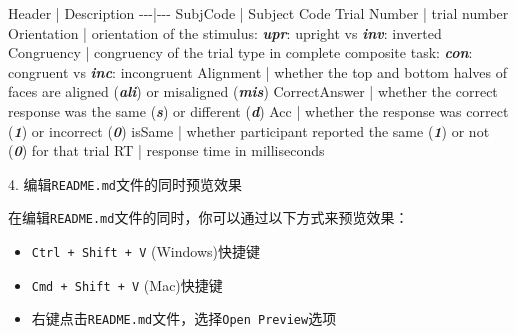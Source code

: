 \documentclass[]{ctexbook}
\newenvironment{Shaded}{\begin{snugshade}}{\end{snugshade}}
\newcommand{\InformationTok}[1]{\textcolor[rgb]{0.56,0.35,0.01}{\textbf{\textit{#1}}}}
\newcommand{\NormalTok}[1]{#1}
\providecommand{\tightlist}{%
  \setlength{\itemsep}{0pt}\setlength{\parskip}{0pt}}
\theoremstyle{definition}
\theoremstyle{definition}
\theoremstyle{definition}
\theoremstyle{definition}
\theoremstyle{remark}
\begin{document}
\begin{Shaded}
\begin{Highlighting}[]

\NormalTok{Header | Description}
\NormalTok{{-}{-}{-}|{-}{-}{-}}
\NormalTok{SubjCode | Subject Code}
\NormalTok{Trial Number | trial number}
\NormalTok{Orientation | orientation of the stimulus: }\InformationTok{\textasciigrave{}upr\textasciigrave{}}\NormalTok{: upright vs }\InformationTok{\textasciigrave{}inv\textasciigrave{}}\NormalTok{: inverted}
\NormalTok{Congruency | congruency of the trial type in complete composite task: }\InformationTok{\textasciigrave{}con\textasciigrave{}}\NormalTok{: congruent vs }\InformationTok{\textasciigrave{}inc\textasciigrave{}}\NormalTok{: incongruent}
\NormalTok{Alignment | whether the top and bottom halves of faces are aligned (}\InformationTok{\textasciigrave{}ali\textasciigrave{}}\NormalTok{) or misaligned (}\InformationTok{\textasciigrave{}mis\textasciigrave{}}\NormalTok{)}
\NormalTok{CorrectAnswer | whether the correct response was the same (}\InformationTok{\textasciigrave{}s\textasciigrave{}}\NormalTok{) or different (}\InformationTok{\textasciigrave{}d\textasciigrave{}}\NormalTok{)}
\NormalTok{Acc | whether the response was correct (}\InformationTok{\textasciigrave{}1\textasciigrave{}}\NormalTok{) or incorrect (}\InformationTok{\textasciigrave{}0\textasciigrave{}}\NormalTok{)}
\NormalTok{isSame | whether participant reported the same (}\InformationTok{\textasciigrave{}1\textasciigrave{}}\NormalTok{) or not (}\InformationTok{\textasciigrave{}0\textasciigrave{}}\NormalTok{) for that trial}
\NormalTok{RT | response time in milliseconds}
\end{Highlighting}
\end{Shaded}

4. 编辑\texttt{README.md}文件的同时预览效果

在编辑\texttt{README.md}文件的同时，你可以通过以下方式来预览效果：

\begin{itemize}
\tightlist
\item
  \texttt{Ctrl\ +\ Shift\ +\ V} (Windows)快捷键
\item
  \texttt{Cmd\ +\ Shift\ +\ V} (Mac)快捷键
\item
  右键点击\texttt{README.md}文件，选择\texttt{Open\ Preview}选项
\end{itemize}
\end{document}
